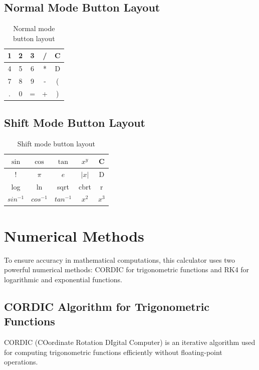 \documentclass[a4paper,12pt]{article}
\begin{document}
\subsection{Normal Mode Button Layout}
\begin{table}[h]
    \centering
    \begin{tabular}{|c|c|c|c|c|}
        \hline
        1 & 2 & 3 & / & C \\
        \hline
        4 & 5 & 6 & * & D \\
        \hline
        7 & 8 & 9 & - & ( \\
        \hline
        . & 0 & = & + & ) \\
        \hline
    \end{tabular}
    \caption{Normal mode button layout}
    \label{tab:normal_buttons}
\end{table}

\subsection{Shift Mode Button Layout}
\begin{table}[h]
    \centering
    \begin{tabular}{|c|c|c|c|c|}
        \hline
        $\sin$ & $\cos$ & $\tan$ & $x^y$ & C \\
        \hline
        ! & $\pi$ & $e$ & $|x|$ & D \\
        \hline
        log & ln & sqrt & cbrt & r \\
        \hline
        $sin^{-1}$ & $cos^{-1}$ & $tan^{-1}$ & $x^2$ & $x^3$ \\
        \hline
    \end{tabular}
    \caption{Shift mode button layout}
    \label{tab:shift_buttons}
\end{table}

\newpage

\section{Numerical Methods}
To ensure accuracy in mathematical computations, this calculator uses two powerful numerical methods: CORDIC for trigonometric functions and RK4 for logarithmic and exponential functions.

\subsection{CORDIC Algorithm for Trigonometric Functions}
CORDIC (COordinate Rotation DIgital Computer) is an iterative algorithm used for computing trigonometric functions efficiently without floating-point operations.
\end{document}
